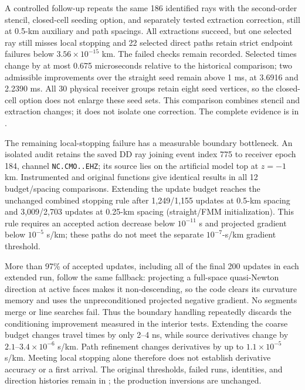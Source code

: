 \documentclass[11pt]{article}
\begin{document}
A controlled follow-up repeats the same 186 identified rays with the
second-order stencil, closed-cell seeding option, and separately tested
extraction correction, still at 0.5-km auxiliary and path spacings. All
extractions succeed, but one selected ray still misses local stopping and
22 selected direct paths retain strict endpoint failures below
$3.56\times10^{-15}$ km. The failed checks remain recorded. Selected times
change by at most 0.675 microseconds relative to the historical comparison;
two admissible improvements over the straight seed remain above 1 ms,
at 3.6916 and 2.2390 ms. All 30 physical receiver groups retain eight seed
vertices, so the closed-cell option does not enlarge these seed sets.
This comparison combines stencil and extraction changes; it does not isolate
one correction. The complete evidence is in
.

The remaining local-stopping failure has a measurable boundary bottleneck.
An isolated audit retains the saved DD ray joining event index 775 to
receiver epoch 184, channel \texttt{NC.CMO..EHZ}; its source lies on the
artificial model top at $z=-1$ km. Instrumented and original functions give
identical results in all 12 budget/spacing comparisons. Extending the update
budget reaches the unchanged combined stopping rule after 1,249/1,155
updates at 0.5-km spacing and 3,009/2,703 updates at 0.25-km spacing
(straight/FMM initialization). This rule requires an accepted action decrease
below $10^{-11}$ s and projected gradient below $10^{-5}$ s/km; these paths
do not meet the separate $10^{-7}$-s/km gradient threshold.

More than 97\% of accepted updates, including all of the final 200 updates
in each extended run, follow the same fallback: projecting a full-space quasi-Newton direction at
active faces makes it non-descending, so the code clears its curvature memory
and uses the unpreconditioned projected negative gradient. No segments merge
or line searches fail. Thus the boundary handling repeatedly discards the
conditioning improvement measured in the interior tests. Extending the coarse
budget changes travel times by only 2--4 ns, while source derivatives change
by $2.1$--$3.4\times10^{-6}$ s/km. Path refinement changes derivatives by
up to $1.1\times10^{-5}$ s/km. Meeting local stopping alone therefore does
not establish derivative accuracy or a first arrival. The original thresholds,
failed runs, identities, and direction histories remain in
; the production
inversions are unchanged.
\end{document}
